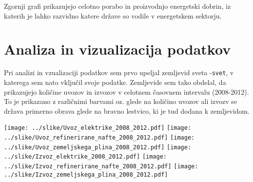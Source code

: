 \documentclass[11pt,a4paper]{article}
\begin{document}
Zgornji grafi prikazujejo celotno porabo in proizvodnjo energetski dobrin, iz katerih je lahko razvidno katere države so vodile v energetskem sektorju.

\pagebreak

\section{Analiza in vizualizacija podatkov}

Pri analizi in vzualizaciji podatkov sem prvo upeljal zemljevid sveta -\verb|svet|, v katerega sem nato vključil svoje podatke. Zemljevide sem tako obdelal, da prikazujejo količine uvozov in izvozov v celotnem časovnem intervalu (2008-2012). To je prikazano z različnimi barvami oz. glede na količino uvozov ali izvozv se država primerno obrava glede na bravno lestvico, ki je tud dodana k zemljevidom.

\texttt{[image: ../slike/Uvoz\_elektrike\_2008\_2012.pdf]}
\texttt{[image: ../slike/Uvoz\_refinerirane\_nafte\_2008\_2012.pdf]}
\texttt{[image: ../slike/Uvoz\_zemeljskega\_plina\_2008\_2012.pdf]}
\texttt{[image: ../slike/Izvoz\_elektrike\_2008\_2012.pdf]}
\texttt{[image: ../slike/Izvoz\_refinerirane\_nafte\_2008\_2012.pdf]}
\texttt{[image: ../slike/Izvoz\_zemeljskega\_plina\_2008\_2012.pdf]}
\end{document}
